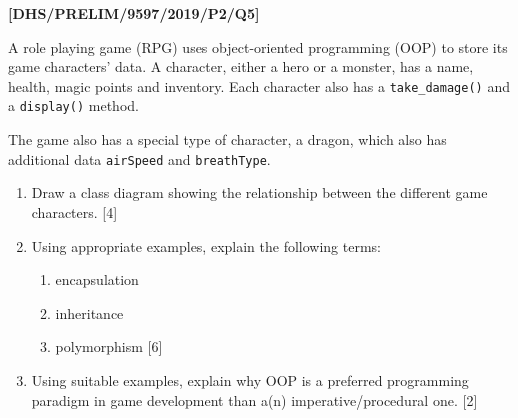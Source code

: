 \item \textbf{{[}DHS/PRELIM/9597/2019/P2/Q5{]} }

A role playing game (RPG) uses object-oriented programming (OOP) to
store its game characters' data. A character, either a hero or a monster,
has a name, health, magic points and inventory. Each character also
has a \texttt{take\_damage()} and a \texttt{display()} method. 

The game also has a special type of character, a dragon, which also
has additional data \texttt{airSpeed} and \texttt{breathType}.
\begin{enumerate}
\item Draw a class diagram showing the relationship between the different
game characters. \hfill{}{[}4{]}
\item Using appropriate examples, explain the following terms:
\begin{enumerate}
\item encapsulation
\item inheritance
\item polymorphism \hfill{}{[}6{]}
\end{enumerate}
\item Using suitable examples, explain why OOP is a preferred programming
paradigm in game development than a(n) imperative/procedural one.
\hfill{} {[}2{]}
\end{enumerate}